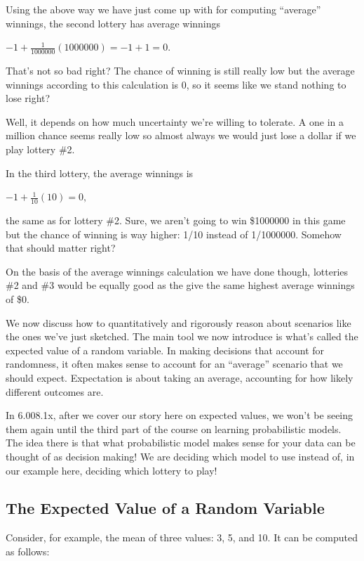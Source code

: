\documentclass[6008notes.tex]{subfiles}
\begin{document}
Using the above way we have just come up with for computing ``average'' winnings, the second lottery has average winnings

{\centering$-1+\frac{1}{1000000}(1000000)=-1+1=0.$ \par}
 
That's not so bad right? The chance of winning is still really low but the average winnings according to this calculation is 0, so it seems like we stand nothing to lose right?

Well, it depends on how much uncertainty we're willing to tolerate. A one in a million chance seems really low so almost always we would just lose a dollar if we play lottery \#2.

In the third lottery, the average winnings is

{\centering$-1+\frac{1}{10}(10)=0,$ \par}
 
the same as for lottery \#2. Sure, we aren't going to win \$1000000 in this game but the chance of winning is way higher: 1/10 instead of 1/1000000. Somehow that should matter right?

On the basis of the average winnings calculation we have done though, lotteries \#2 and \#3 would be equally good as the give the same highest average winnings of \$0.

We now discuss how to quantitatively and rigorously reason about scenarios like the ones we've just sketched. The main tool we now introduce is what's called the expected value of a random variable. In making decisions that account for randomness, it often makes sense to account for an ``average'' scenario that we should expect. Expectation is about taking an average, accounting for how likely different outcomes are.

In 6.008.1x, after we cover our story here on expected values, we won't be seeing them again until the third part of the course on learning probabilistic models. The idea there is that what probabilistic model makes sense for your data can be thought of as decision making! We are deciding which model to use instead of, in our example here, deciding which lottery to play!

\subsection{The Expected Value of a Random Variable}

Consider, for example, the mean of three values: 3, 5, and 10. It can be computed as follows:
\end{document}
